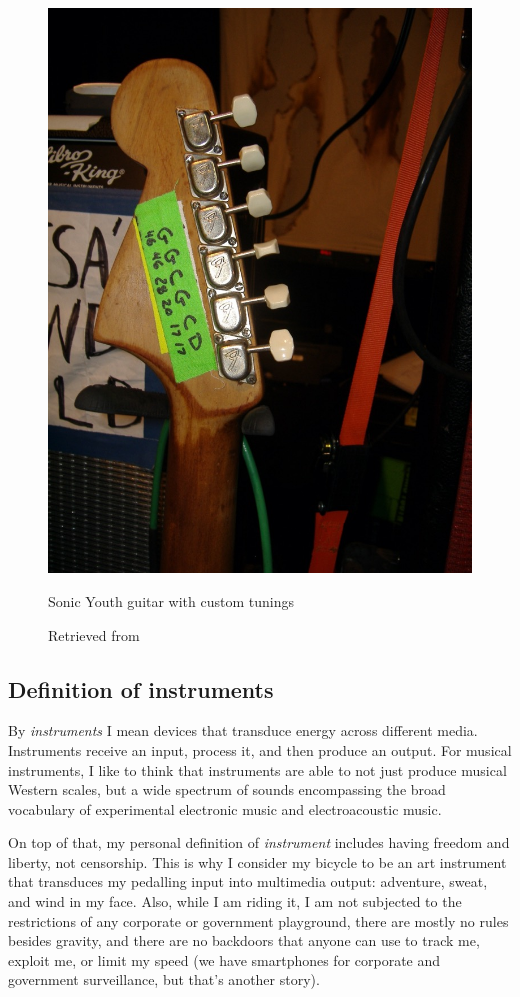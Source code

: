 \begin{figure}[ht]
  \centering
  \includegraphics[width=0.75\linewidth,height=0.30\textheight,keepaspectratio]{images/sonic-youth-guitar.jpg}
  \caption{Sonic Youth guitar with custom tunings}
  \caption*{Retrieved from \cite{sonic-youth-illustrated-equipment-guide}}
  \label{fig:sonic-youth-guitar}
\end{figure}

\subsection{Definition of instruments}

By \emph{instruments} I mean devices that transduce energy across different media. Instruments receive an input, process it, and then produce an output. For musical instruments, I like to think that instruments are able to not just produce musical Western scales, but a wide spectrum of sounds encompassing the broad vocabulary of experimental electronic music and electroacoustic music.

On top of that, my personal definition of \emph{instrument} includes having freedom and liberty, not censorship. This is why I consider my bicycle to be an art instrument that transduces my pedalling input into multimedia output: adventure, sweat, and wind in my face. Also, while I am riding it, I am not subjected to the restrictions of any corporate or government playground, there are mostly no rules besides gravity, and there are no backdoors that anyone can use to track me, exploit me, or limit my speed (we have smartphones for corporate and government surveillance, but that's another story).

